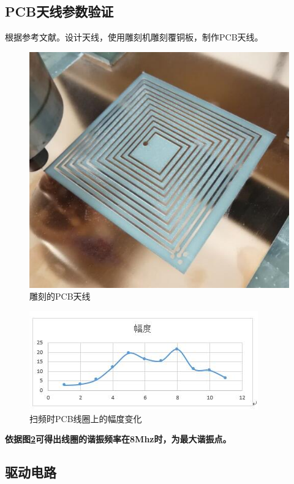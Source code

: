 ﻿\documentclass[UTF-8,12pt]{ctexart}
\begin{document}
    \subsection{PCB天线参数验证}
         根据参考文献。设计天线，使用雕刻机雕刻覆铜板，制作PCB天线。
        \begin{figure}[H]
          \centering
          \includegraphics[scale=0.6]{5200.jpg}
          \caption{雕刻的PCB天线}
          \label{幅度变化}
        \end{figure}
        
        \begin{figure}[H]
          \centering
          \includegraphics[scale=1]{Amp_power.jpg}
          \caption{扫频时PCB线圈上的幅度变化}
          \label{幅度变化}
        \end{figure}
        {\bf{依据图\ref{幅度变化}可得出线圈的谐振频率在8Mhz时，为最大谐振点。}}





    \subsection{驱动电路}
\end{document}
